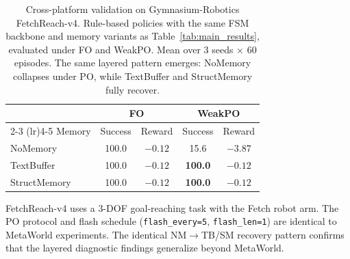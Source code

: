 \begin{table}[t]
\centering
\caption{Cross-platform validation on Gymnasium-Robotics FetchReach-v4. Rule-based policies with the same FSM backbone and memory variants as Table~\ref{tab:main_results}, evaluated under FO and WeakPO. Mean over 3 seeds $\times$ 60 episodes. The same layered pattern emerges: NoMemory collapses under PO, while TextBuffer and StructMemory fully recover.}
\label{tab:cross_platform}
\begin{tabular}{l cc cc}
\toprule
& \multicolumn{2}{c}{FO} & \multicolumn{2}{c}{WeakPO} \\
\cmidrule(lr){2-3} \cmidrule(lr){4-5}
Memory & Success & Reward & Success & Reward \\
\midrule
NoMemory     & 100.0 & $-0.12$ & 15.6 & $-3.87$ \\
TextBuffer   & 100.0 & $-0.12$ & \textbf{100.0} & $-0.12$ \\
StructMemory & 100.0 & $-0.12$ & \textbf{100.0} & $-0.12$ \\
\bottomrule
\end{tabular}
\begin{flushleft}
\footnotesize FetchReach-v4 uses a 3-DOF goal-reaching task with the Fetch robot arm. The PO protocol and flash schedule (\texttt{flash\_every=5}, \texttt{flash\_len=1}) are identical to MetaWorld experiments. The identical NM$\to$TB/SM recovery pattern confirms that the layered diagnostic findings generalize beyond MetaWorld.
\end{flushleft}
\end{table}
